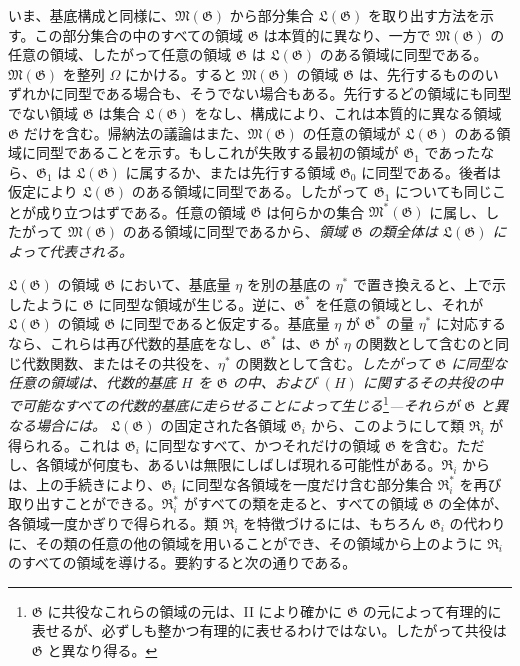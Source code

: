 \documentclass[11pt]{article}
\begin{document}
いま、基底構成と同様に、$\mathfrak M(\mathfrak G)$ から部分集合 $\mathfrak L(\mathfrak G)$ を取り出す方法を示す。この部分集合の中のすべての領域 $\mathfrak G$ は本質的に異なり、一方で $\mathfrak M(\mathfrak G)$ の任意の領域、したがって任意の領域 $\mathfrak G$ は $\mathfrak L(\mathfrak G)$ のある領域に同型である。$\mathfrak M(\mathfrak G)$ を整列 $\Omega$ にかける。すると $\mathfrak M(\mathfrak G)$ の領域 $\mathfrak G$ は、先行するもののいずれかに同型である場合も、そうでない場合もある。先行するどの領域にも同型でない領域 $\mathfrak G$ は集合 $\mathfrak L(\mathfrak G)$ をなし、構成により、これは本質的に異なる領域 $\mathfrak G$ だけを含む。帰納法の議論はまた、$\mathfrak M(\mathfrak G)$ の任意の領域が $\mathfrak L(\mathfrak G)$ のある領域に同型であることを示す。もしこれが失敗する最初の領域が $\mathfrak G_1$ であったなら、$\mathfrak G_1$ は $\mathfrak L(\mathfrak G)$ に属するか、または先行する領域 $\mathfrak G_0$ に同型である。後者は仮定により $\mathfrak L(\mathfrak G)$ のある領域に同型である。したがって $\mathfrak G_1$ についても同じことが成り立つはずである。任意の領域 $\mathfrak G$ は何らかの集合 $\mathfrak M^*(\mathfrak G)$ に属し、したがって $\mathfrak M(\mathfrak G)$ のある領域に同型であるから、\emph{領域 $\mathfrak G$ の類全体は $\mathfrak L(\mathfrak G)$ によって代表される。}

$\mathfrak L(\mathfrak G)$ の領域 $\mathfrak G$ において、基底量 $\eta$ を別の基底の $\eta^*$ で置き換えると、上で示したように $\mathfrak G$ に同型な領域が生じる。逆に、$\mathfrak G^*$ を任意の領域とし、それが $\mathfrak L(\mathfrak G)$ の領域 $\mathfrak G$ に同型であると仮定する。基底量 $\eta$ が $\mathfrak G^*$ の量 $\eta^*$ に対応するなら、これらは再び代数的基底をなし、$\mathfrak G^*$ は、$\mathfrak G$ が $\eta$ の関数として含むのと同じ代数関数、またはその共役を、$\eta^*$ の関数として含む。\emph{したがって $\mathfrak G$ に同型な任意の領域は、代数的基底 $H$ を $\mathfrak G$ の中、および $(H)$ に関するその共役の中で可能なすべての代数的基底に走らせることによって生じる}\footnote{$\mathfrak G$ に共役なこれらの領域の元は、II により確かに $\mathfrak G$ の元によって有理的に表せるが、必ずしも整かつ有理的に表せるわけではない。したがって共役は $\mathfrak G$ と異なり得る。}\emph{---それらが $\mathfrak G$ と異なる場合には。} $\mathfrak L(\mathfrak G)$ の固定された各領域 $\mathfrak G_i$ から、このようにして類 $\mathfrak R_i$ が得られる。これは $\mathfrak G_i$ に同型なすべて、かつそれだけの領域 $\mathfrak G$ を含む。ただし、各領域が何度も、あるいは無限にしばしば現れる可能性がある。$\mathfrak R_i$ からは、上の手続きにより、$\mathfrak G_i$ に同型な各領域を一度だけ含む部分集合 $\mathfrak R_i^*$ を再び取り出すことができる。$\mathfrak R_i^*$ がすべての類を走ると、すべての領域 $\mathfrak G$ の全体が、各領域一度かぎりで得られる。類 $\mathfrak R_i$ を特徴づけるには、もちろん $\mathfrak G_i$ の代わりに、その類の任意の他の領域を用いることができ、その領域から上のように $\mathfrak R_i$ のすべての領域を導ける。要約すると次の通りである。
\end{document}
